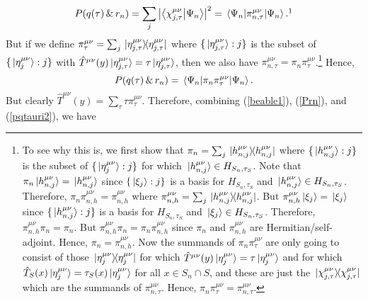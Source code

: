 \begin{equation}\label{pqtauri}
P(q(\tau)\, \& \,r_n)=\sum_j \abs{ \ip{\chi_{j,\tau}^{\mu\nu}}{\Psi_n}}^2=\ev*{\pi_{n,\tau}^{\mu\nu}}{\Psi_n}.\protect\footnotemark
\end{equation}
But %
%
 if we define $\pi_\tau^{\mu\nu}=\sum_j\dyad*{\eta_{j,\tau}^{\mu\nu}}$ where $\{\ket*{\eta_{j,\tau}^{\mu\nu}}:j\}$ is %
  the subset of  $\{\ket*{\eta_j^{\mu\nu}}:j\}$ with $\hat{T}^{\mu\nu}(y)\ket*{\eta_{j,\tau}^{\mu\nu}}=\tau\ket*{\eta_{j,\tau}^{\mu\nu}}$, then we also have  $\pi_{n,\tau}^{\mu\nu}=\pi_n\pi_\tau^{\mu\nu}$.\footnote{To see why this is, 
we first show that $\pi_n=\sum_j\dyad*{h_{n,j}^{\mu\nu}}$ where $\{\ket*{h_{n,j}^{\mu\nu}}:j\}$ is the subset of $\{\ket*{\eta_j^{\mu\nu}}:j\}$  for which $\ket*{h_{n,j}^{\mu\nu}}\in H_{S_n,\tau_S}$. 
Note that $\pi_n\ket*{h_{n,j}^{\mu\nu}}=\ket*{h_{n,j}^{\mu\nu}}$    since $\{\ket*{\xi_j}:j\}$ is a basis for $H_{S_n,\tau_S}$ and $\ket*{h_{n,j}^{\mu\nu}}\in H_{S_n,\tau_S}$. 
Therefore, $\pi_n\pi_{n,h}^{\mu\nu}=\pi_{n,h}^{\mu\nu}$  where  $\pi_{n,h}^{\mu\nu}=\sum_j\dyad*{h_{n,j}^{\mu\nu}}$. 
But  $\pi_{n,h}^{\mu\nu}\ket*{\xi_j}=\ket*{\xi_j}$ since $\{\ket*{h_{n,j}^{\mu\nu}}:j\}$ is a basis for $H_{S_n,\tau_S}$ and $\ket*{\xi_j}\in H_{S_n,\tau_S}$. 
Therefore, $\pi_{n,h}^{\mu\nu}\pi_n=\pi_n.$ But $\pi_{n,h}^{\mu\nu}\pi_n= \pi_n\pi_{n,h}^{\mu\nu}$ since $\pi_n$ and $\pi_{n,h}^{\mu\nu}$ are Hermitian/self-adjoint. Hence, $\pi_n= \pi_{n,h}^{\mu\nu}$. Now the summands of $\pi_n\pi_\tau^{\mu\nu}$ are only going to consist of those $\dyad*{\eta_j^{\mu\nu}}$ for which $\hat{T}^{\mu\nu}(y)\ket*{\eta_j^{\mu\nu}}=\tau\ket*{\eta_j^{\mu\nu}}$ and for which $\hat{T}_S(x)\ket*{\eta_j^{\mu\nu}}=\tau_S(x)\ket*{\eta_j^{\mu\nu}}$ for all $x\in S_n\cap S$, and these are just the $\dyad*{\chi_{j,\tau}^{\mu\nu}}$ which are the summands of  $\pi_{n,\tau}^{\mu\nu}$. Hence,  $\pi_n\pi_\tau^{\mu\nu}=\pi_{n,\tau}^{\mu\nu}.$} 
  Hence,
\begin{equation}\label{pqtauri2}
P(q(\tau)\, \& \, r_n)=\ev*{\pi_n\pi_\tau^{\mu\nu}}{\Psi_n}.
\end{equation}
But clearly $\hat{T}^{\mu\nu}(y)=\sum_\tau \tau \pi_\tau^{\mu\nu}.$ Therefore, combining (\ref{beable1}), (\ref{Prn}), and (\ref{pqtauri2}), we have 
